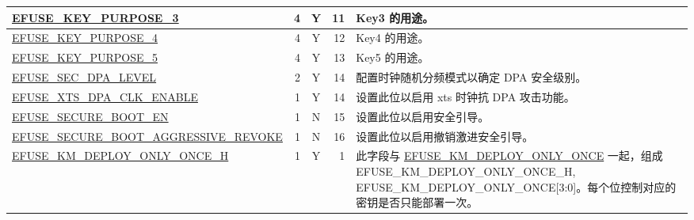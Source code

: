\begin{longtable}[l]{ |m{8.2cm}|r|c|r|m{9cm}| }
    \hyperref[fielddesc:EFUSEKEYPURPOSE3]{EFUSE\_KEY\_PURPOSE\_3} & 4 & Y & 11 & Key3 的用途。 \\ \hline
    \hyperref[fielddesc:EFUSEKEYPURPOSE4]{EFUSE\_KEY\_PURPOSE\_4} & 4 & Y & 12 & Key4 的用途。 \\ \hline
    \hyperref[fielddesc:EFUSEKEYPURPOSE5]{EFUSE\_KEY\_PURPOSE\_5} & 4 & Y & 13 & Key5 的用途。 \\ \hline
    \hyperref[fielddesc:EFUSESECDPALEVEL]{EFUSE\_SEC\_DPA\_LEVEL} & 2 & Y & 14 & 配置时钟随机分频模式以确定 DPA 安全级别。 \\ \hline
    \hyperref[fielddesc:EFUSEXTSDPACLKENABLE]{EFUSE\_XTS\_DPA\_CLK\_ENABLE} & 1 & Y & 14 & 设置此位以启用 xts 时钟抗 DPA 攻击功能。 \\ \hline
    \hyperref[fielddesc:EFUSESECUREBOOTEN]{EFUSE\_SECURE\_BOOT\_EN} & 1 & N & 15 & 设置此位以启用安全引导。 \\ \hline
    \hyperref[fielddesc:EFUSESECUREBOOTAGGRESSIVEREVOKE]{EFUSE\_SECURE\_BOOT\_AGGRESSIVE\_REVOKE} & 1 & N & 16 & 设置此位以启用撤销激进安全引导。 \\ \hline
    \hyperref[fielddesc:EFUSEKMDEPLOYONLYONCEH]{EFUSE\_KM\_DEPLOY\_ONLY\_ONCE\_H} & 1 & Y & 1 & 此字段与 \hyperref[fielddesc:EFUSEKMDEPLOYONLYONCE]{EFUSE\_\-KM\_\-DEPLOY\_\-ONLY\_\-ONCE} 一起，组成 {EFUSE\_\-KM\_\-DEPLOY\_\-ONLY\_\-ONCE\_\-H, EFUSE\_\-KM\_DEPLOY\_\-ONLY\_\-ONCE[3:0]}。每个位控制对应的密钥是否只能部署一次。\\ \hline


\end{longtable}
